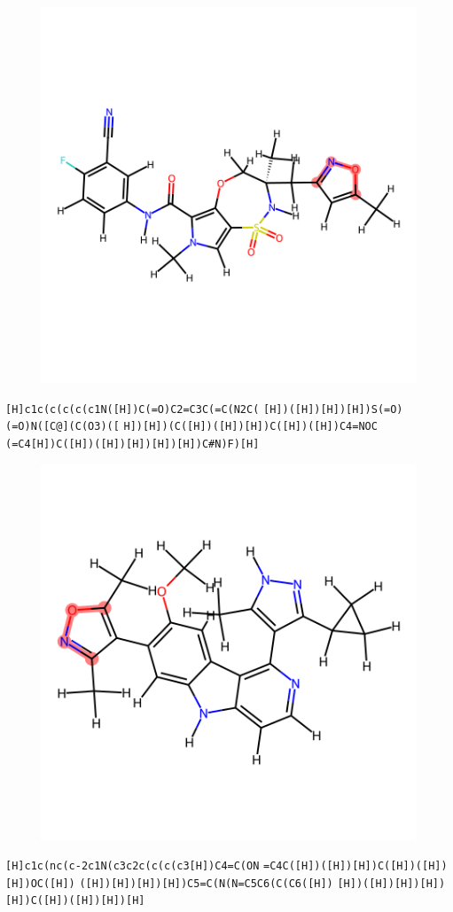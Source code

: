 \documentclass{article}
\begin{document}
\begin{figure}[ht]
\centering
    \includegraphics{mol152.png}
\end{figure}
\verb|[H]c1c(c(c(c(c1N([H])C(=O)C2=C3C(=C(N2C(| \verb|[H])([H])[H])[H])S(=O)(=O)N([C@](C(O3)([| \verb|H])[H])(C([H])([H])[H])C([H])([H])C4=NOC| \verb|(=C4[H])C([H])([H])[H])[H])[H])C#N)F)[H]|

\begin{figure}[ht]
\centering
    \includegraphics{mol153.png}
\end{figure}
\verb|[H]c1c(nc(c-2c1N(c3c2c(c(c(c3[H])C4=C(ON| \verb|=C4C([H])([H])[H])C([H])([H])[H])OC([H])| \verb|([H])[H])[H])[H])C5=C(N(N=C5C6(C(C6([H])| \verb|[H])([H])[H])[H])[H])C([H])([H])[H])[H]|
\end{document}
